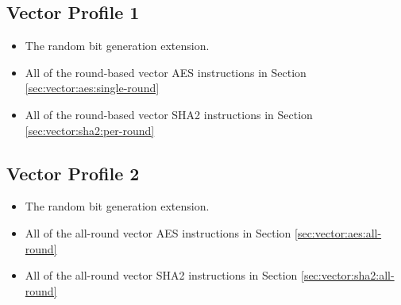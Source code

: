 \subsection{Vector Profile 1}

\begin{itemize}
\item The random bit generation extension.
\item All of the round-based vector AES instructions in Section
      \ref{sec:vector:aes:single-round}
\item All of the round-based vector SHA2 instructions in Section
      \ref{sec:vector:sha2:per-round}
\end{itemize}

\subsection{Vector Profile 2}

\begin{itemize}
\item The random bit generation extension.
\item All of the all-round vector AES instructions in Section
      \ref{sec:vector:aes:all-round}
\item All of the all-round vector SHA2 instructions in Section
      \ref{sec:vector:sha2:all-round}
\end{itemize}
